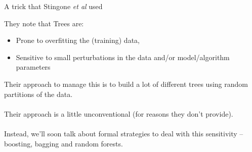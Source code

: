 \documentclass[mathserif, aspectratio=169]{beamer}
\begin{document}
\begin{frame}{A trick that Stingone \textit{et al }used}

They note that Trees are: 
\begin{itemize}
\item Prone to overfitting the (training) data, 
\item Sensitive to small perturbations in the data and/or model/algorithm parameters
\end{itemize}

Their approach to manage this is to build a lot of different trees using random partitions of the data.  \\~\\
Their approach is a little unconventional (for  reasons they don't provide).\\~\\

Instead, we'll soon talk about formal strategies to deal with this sensitivity -- boosting, bagging and random forests.  

\end{frame}
\end{document}
